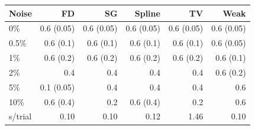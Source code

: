 \begin{tabular}{lrrrrr}\toprule
Noise & FD & SG & Spline & TV & Weak \\\midrule
0\% & 0.6 (0.05) & 0.6 (0.05) & 0.6 (0.05) & 0.6 (0.05) & 0.6 (0.05) \\
0.5\% & 0.6 (0.1) & 0.6 (0.1) & 0.6 (0.1) & 0.6 (0.1) & 0.6 (0.05) \\
1\% & 0.6 (0.2) & 0.6 (0.2) & 0.6 (0.2) & 0.6 (0.2) & 0.6 (0.1) \\
2\% & 0.4 & 0.4 & 0.4 & 0.4 & 0.6 (0.2) \\
5\% & 0.1 (0.05) & 0.4 & 0.4 & 0.4 & 0.6 \\
10\% & 0.6 (0.4) & 0.2 & 0.6 (0.4) & 0.2 & 0.6 \\\midrule
s/trial & 0.10 & 0.10 & 0.12 & 1.46 & 0.10 \\
\bottomrule\end{tabular}
